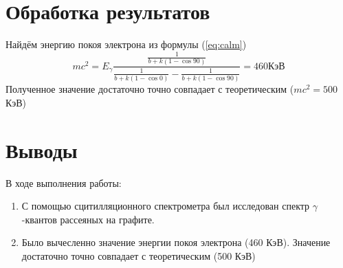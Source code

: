 \documentclass{article}
\begin{document}
\section{Обработка результатов}
Найдём энергию покоя электрона из формулы (\ref{eq:calm})
\[ mc^2 = E_{\gamma}\frac{\frac{1}{b + k (1-\cos{90})}}{\frac{1}{b + k(1-\cos{0})} - \frac{1}{b + k(1-\cos{90})}} = 460 \text{КэВ}\]
Полученное значение достаточно точно совпадает с теоретическим (\(mc^2 = 500\) КэВ)
\section{Выводы}
В ходе выполнения работы:
\begin{enumerate}
\item С помощью сцитилляционного спектрометра был исследован спектр \(\gamma\)-квантов рассеяных на графите.
\item Было вычесленно значение энергии покоя электрона (460 КэВ). Значение достаточно точно совпадает с теоретическим (500 КэВ)
\end{enumerate}
\end{document}
